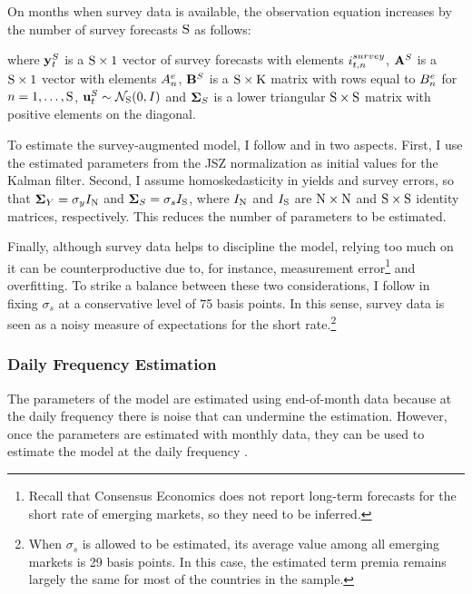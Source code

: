 {On months when survey data is available, the observation equation increases by the number of survey forecasts \(\mathrm{S}\) as follows:
	
\noindent where \(\mathbf{y}_{t}^{S}\) is a \(\mathrm{S} \times 1\) vector of survey forecasts with elements \(i_{t,n}^{survey}\), \(\mathbf{A}^{S}\) is a \(\mathrm{S} \times 1\) vector with elements \(A_{n}^{e}\), \(\mathbf{B}^{S}\) is a \(\mathrm{S} \times \mathrm{K}\) matrix with rows equal to \(B_{n}^{e}\) for \(n = 1, \ldots, \mathrm{S}\), \(\mathbf{u}_{t}^{S} \sim \mathcal{N}_{\mathrm{S}} (0,I) \) and \(\mathbf{\mathbf{\Sigma}}_{S}\) is a lower triangular \(\mathrm{S} \times \mathrm{S}\) matrix with positive elements on the diagonal.

To estimate the survey-augmented model, I follow \cite{Guimaraes:2014} and \cite{Lloyd:2018b} in two aspects. First, I use the estimated parameters from the JSZ normalization as initial values for the Kalman filter.
Second, I assume homoskedasticity in yields and survey errors, so that \(\mathbf{\mathbf{\Sigma}}_{Y} = \sigma_y I_{\mathrm{N}}\) and \(\mathbf{\mathbf{\Sigma}}_{S} = \sigma_s I_{\mathrm{S}}\), where \(I_{\mathrm{N}}\) and \(I_{\mathrm{S}}\) are \(\mathrm{N} \times \mathrm{N}\) and \(\mathrm{S} \times \mathrm{S}\) identity matrices, respectively.
This reduces the number of parameters to be estimated.

Finally, although survey data helps to discipline the model, relying too much on it can be counterproductive due to, for instance, measurement error\footnote{ Recall that Consensus Economics does not report long-term forecasts for the short rate of emerging markets, so they need to be inferred.} and overfitting. 
To strike a balance between these two considerations, I follow \cite{KimOrphanides:2012} in fixing \(\sigma_s\) at a conservative level of 75 basis points. 
In this sense, survey data is seen as a noisy measure of expectations for the short rate.\footnote{ When \(\sigma_s\) is allowed to be estimated, its average value among all emerging markets is 29 basis points.
In this case, the estimated term premia remains largely the same for most of the countries in the sample.}

\subsubsection{Daily Frequency Estimation}
\iftoggle{toclinks}{\gototoc}{} %
The parameters of the model are estimated using end-of-month data because at the daily frequency there is noise that can undermine the estimation. 
However, once the parameters are estimated with monthly data, they can be used to estimate the model at the daily frequency \citep{ACM:2013}.

}
